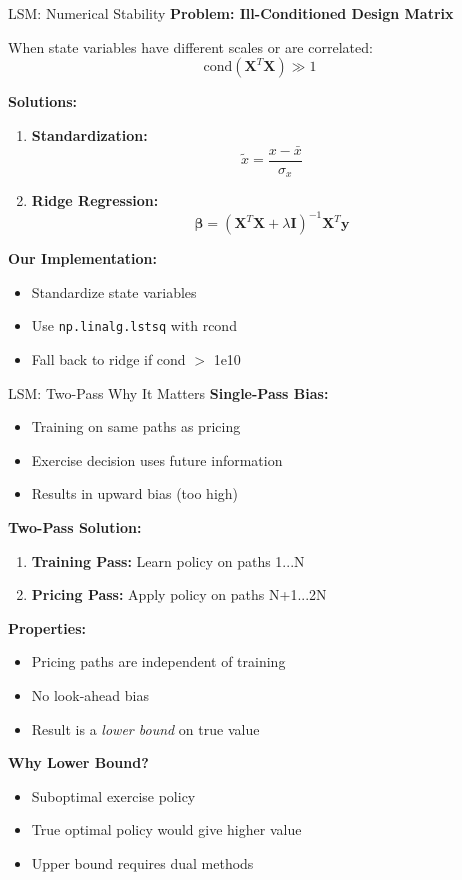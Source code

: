 \documentclass[aspectratio=169,11pt]{beamer}
\begin{document}
\begin{frame}{LSM: Numerical Stability}
\textbf{Problem: Ill-Conditioned Design Matrix}

When state variables have different scales or are correlated:
\[
\text{cond}(\mathbf{X}^T\mathbf{X}) \gg 1
\]

\textbf{Solutions:}
\begin{enumerate}
    \item \textbf{Standardization:}
    \[
    \tilde{x} = \frac{x - \bar{x}}{\sigma_x}
    \]

    \item \textbf{Ridge Regression:}
    \[
    \boldsymbol{\beta} = (\mathbf{X}^T\mathbf{X} + \lambda\mathbf{I})^{-1}\mathbf{X}^T\mathbf{y}
    \]
\end{enumerate}

\textbf{Our Implementation:}
\begin{itemize}
    \item Standardize state variables
    \item Use \texttt{np.linalg.lstsq} with rcond
    \item Fall back to ridge if cond $>$ 1e10
\end{itemize}
\end{frame}

\begin{frame}{LSM: Two-Pass Why It Matters}
\textbf{Single-Pass Bias:}
\begin{itemize}
    \item Training on same paths as pricing
    \item Exercise decision uses future information
    \item Results in upward bias (too high)
\end{itemize}

\textbf{Two-Pass Solution:}
\begin{enumerate}
    \item \textbf{Training Pass:} Learn policy on paths 1...N
    \item \textbf{Pricing Pass:} Apply policy on paths N+1...2N
\end{enumerate}

\textbf{Properties:}
\begin{itemize}
    \item Pricing paths are independent of training
    \item No look-ahead bias
    \item Result is a \textit{lower bound} on true value
\end{itemize}

\textbf{Why Lower Bound?}
\begin{itemize}
    \item Suboptimal exercise policy
    \item True optimal policy would give higher value
    \item Upper bound requires dual methods
\end{itemize}
\end{frame}
\end{document}
